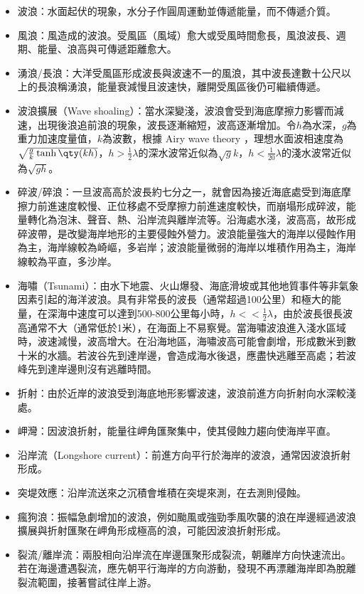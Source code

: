 \documentclass[a4paper,12pt]{report}
\begin{document}
\begin{itemize}
\item 波浪：水面起伏的現象，水分子作圓周運動並傳遞能量，而不傳遞介質。
\item 風浪：風造成的波浪。受風區（風域）愈大或受風時間愈長，風浪波長、週期、能量、浪高與可傳遞距離愈大。
\item 湧浪/長浪：大洋受風區形成波長與波速不一的風浪，其中波長達數十公尺以上的長浪稱湧浪，能量衰減慢且波速快，離開受風區後仍可繼續傳遞。
\item 波浪擴展（Wave shoaling）：當水深變淺，波浪會受到海底摩擦力影響而減速，出現後浪追前浪的現象，波長逐漸縮短，波高逐漸增加。令$h$為水深，$g$為重力加速度量值，$k$為波數，根據 Airy wave theory ，理想水面波相速度為$\sqrt{\frac{g}{k}\tanh\qty(kh)}$，$h>\frac{1}{2}\lambda$的深水波常近似為$\sqrt{g}{k}$，$h<\frac{1}{20}\lambda$的淺水波常近似為$\sqrt{gh}$。
\item 碎波/碎浪：一旦波高高於波長約七分之一，就會因為接近海底處受到海底摩擦力前進速度較慢、正位移處不受摩擦力前進速度較快，而崩塌形成碎波，能量轉化為泡沫、聲音、熱、沿岸流與離岸流等。沿海處水淺，波高高，故形成碎波帶，是改變海岸地形的主要侵蝕外營力。波浪能量強大的海岸以侵蝕作用為主，海岸線較為崎嶇，多岩岸；波浪能量微弱的海岸以堆積作用為主，海岸線較為平直，多沙岸。
\item 海嘯（Tsunami）：由水下地震、火山爆發、海底滑坡或其他地質事件等非氣象因素引起的海洋波浪。具有非常長的波長（通常超過100公里）和極大的能量，在深海中速度可以達到500-800公里每小時，$h<<\frac{1}{2}\lambda$，由於波長很長波高通常不大（通常低於1米），在海面上不易察覺。當海嘯波浪進入淺水區域時，波速減慢，波高增大。在沿海地區，海嘯波高可能會劇增，形成數米到數十米的水牆。若波谷先到達岸邊，會造成海水後退，應盡快逃離至高處；若波峰先到達岸邊則沒有逃離時間。
\item 折射：由於近岸的波浪受到海底地形影響波速，波浪前進方向折射向水深較淺處。
\item 岬灣：因波浪折射，能量往岬角匯聚集中，使其侵蝕力趨向使海岸平直。
\item 沿岸流（Longshore current）：前進方向平行於海岸的波浪，通常因波浪折射形成。
\item 突堤效應：沿岸流送來之沉積會堆積在突堤來測，在去測則侵蝕。
\item 瘋狗浪：振幅急劇增加的波浪，例如颱風或強勁季風吹襲的浪在岸邊經過波浪擴展與折射匯聚在岬角形成極高的浪，可能因波浪折射形成。
\item 裂流/離岸流：兩股相向沿岸流在岸邊匯聚形成裂流，朝離岸方向快速流出。若在海邊遭遇裂流，應先朝平行海岸的方向游動，發現不再漂離海岸即為脫離裂流範圍，接著嘗試往岸上游。
\end{itemize}
\end{document}
